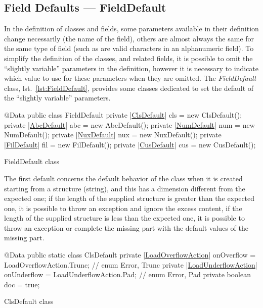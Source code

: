 \documentclass[a4paper,10pt]{report}
\newenvironment{elisting}[1][H]
  {\captionsetup{aboveskip=0pt}\begin{listing}[#1]}
  {\end{listing}%
}
\begin{document}
\subsection{Field Defaults --- FieldDefault}
In the definition of classes and fields, some parameters available in their 
definition change necessarily (the name of the field), others are almost always 
the same for the same type of field (such as are valid characters in an 
alphanumeric field).
To simplify the definition of the classes, and related fields, it is possible to
omit the ``slightly variable'' parameters in the definition, however it is 
necessary to indicate which value to use for these parameters when they are 
omitted. 
The \textsl{FieldDefault} class, lst.~\ref{lst:FieldDefault}, provides some 
classes dedicated to set the default of the ``slightly variable'' parameters.

\begin{elisting}[!htb]
\begin{javacode}
@Data
public class FieldDefault {
    private |\hyperref[lst:ClsDefault]{ClsDefault}| cls = new ClsDefault();
    private |\hyperref[lst:AbcDefault]{AbcDefault}| abc = new AbcDefault();
    private |\hyperref[lst:NumDefault]{NumDefault}| num = new NumDefault();
    private |\hyperref[lst:NuxDefault]{NuxDefault}| nux = new NuxDefault();
    private |\hyperref[lst:FilDefault]{FilDefault}| fil = new FilDefault();
    private |\hyperref[lst:CusDefault]{CusDefault}| cus = new CusDefault();
}
\end{javacode}
\caption{FieldDefault class}
\label{lst:FieldDefault}
\end{elisting}
The first default concerns the default behavior of the class when it is created 
starting from a structure (string), and this has a dimension different from the 
expected one; if the length of the supplied structure is greater than the 
expected one, it is possible to throw an exception and ignore the excess 
content, if the length of the supplied structure is less than the expected one, 
it is possible to throw an exception or complete the missing part with the 
default values of the missing part.

\begin{elisting}[!htb]
\begin{javacode}
@Data
public static class ClsDefault {
    private |\hyperref[lst:LoadOverflowAction]{LoadOverflowAction}| onOverflow = LoadOverflowAction.Trunc;   // enum {Error, Trunc}
    private |\hyperref[lst:LoadUnderflowAction]{LoadUnderflowAction}| onUnderflow = LoadUnderflowAction.Pad;  // enum {Error, Pad}
    private boolean doc = true;
}
\end{javacode}
\caption{ClsDefault class}
\label{lst:ClsDefault}
\end{elisting}
\end{document}
